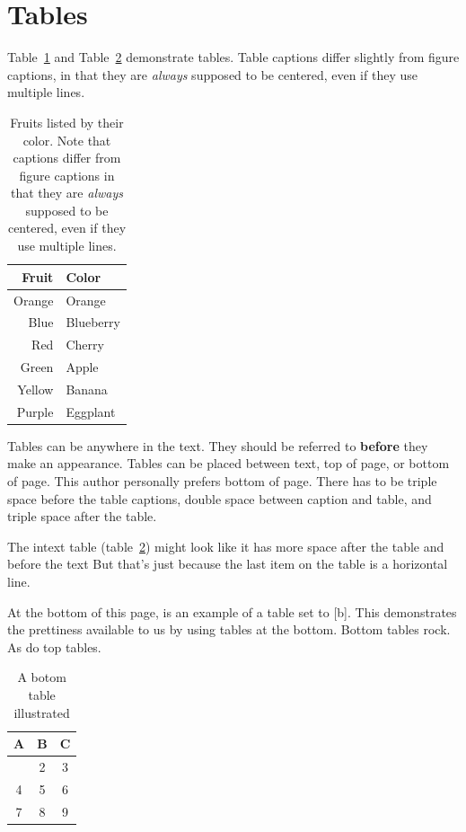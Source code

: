 \section{Tables}

Table~\ref{table_fruit} and Table~\ref{table_silly} demonstrate tables. Table
captions differ slightly from figure captions, in that they are \textit{always}
supposed to be centered, even if they use multiple lines.

\begin{table}[h]
\centering
\caption[Fruits by color]{\centering Fruits listed by their color. Note that
captions differ from figure captions in that they are \textit{always} supposed
to be centered, even if they use multiple lines.}
\label{table_fruit}
\begin{tabular}{rl}
    \hline
    \abovespace\belowspace
    Fruit & Color  \\  \hline
    \abovespace Orange & Orange \\
    Blue & Blueberry \\
    Red & Cherry \\
    Green & Apple \\
    Yellow & Banana \\
    Purple & Eggplant \belowspace \\
    \hline
\end{tabular}
\end{table}

Tables can be anywhere in the text. They should be referred to \textbf{before} they make an appearance. 
Tables can be placed between text, top of page, or bottom of page. This author personally prefers bottom of page. 
There has to be triple space before the table captions, double space between caption and table, and triple space after the table. 

The intext table (table~\ref{table_silly}) might look like it has more space after the table and before the text
But that's just because the last item on the table is a horizontal line. 

At the bottom of this page, is an example of a table set to [b]. This demonstrates the prettiness available to us by using tables at the bottom. 
Bottom tables rock. As do top tables. 
\begin{table}[b]
\centering
\caption[A bottom table]{A botom table illustrated}
\label{table_silly}
\begin{tabular}{ccc}
    \hline
    \abovespace\belowspace
    A & B & C \\  \hline
    \abovespace 1 & 2 & 3 \\
    4 & 5 & 6 \\
    7 & 8 & 9 \belowspace \\
    \hline
\end{tabular}
\end{table}

